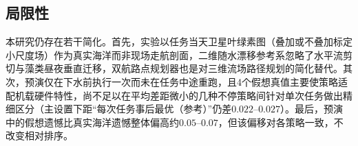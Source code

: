 \subsection{局限性}

本研究仍存在若干简化。首先，实验以任务当天卫星叶绿素图（叠加或不叠加标定小尺度场）作为真实海洋而非现场走航剖面，二维随水漂移参考系忽略了水平流剪切与藻类昼夜垂直迁移，双航路点规划器也是对三维流场路径规划的简化替代。其次，预演仅在下水前执行一次而未在任务中途重跑，且4个假想真值主要使策略适配机载硬件特性，尚不足以在平均差距微小的几种不停策略间针对单次任务做出精细区分（主设置下距“每次任务事后最优（参考）”仍差$0.022\text{--}0.027$）。最后，预演中的假想遗憾比真实海洋遗憾整体偏高约$0.05\text{--}0.07$，但该偏移对各策略一致，不改变相对排序。
